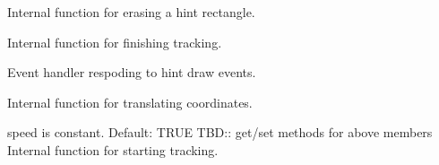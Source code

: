 
Internal function for erasing a hint rectangle.


\label{cbhintanimationpluginfinishtracking}


Internal function for finishing tracking.


\label{cbhintanimationpluginondrawhintrect}


Event handler respoding to hint draw events.


\label{cbhintanimationpluginrecttoscr}


Internal function for translating coordinates.


\label{cbhintanimationpluginstarttracking}


speed is constant. Default: TRUE
TBD:: get/set methods for above members
Internal function for starting tracking.

